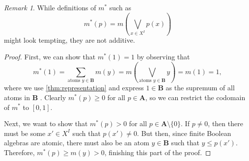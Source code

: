 \documentclass{article}
\theoremstyle{definition}
\theoremstyle{remark}
\newtheorem*{remark}{Remark}
\begin{document}
\begin{remark}
  While definitions of $m^*$ such as
  \[
    m^*(p) = m \left( \bigvee_{x \in X^I} p(x) \right)
  \]
  might look tempting, they are not additive.
\end{remark}

\begin{proof} %
  First, we can show that $m^*(1) = 1$ by observing that
  \[
    m^*(1) = \sum_{\text{atoms } y \in \mathbf{B}} m(y) = m \left(
      \bigvee_{\text{atoms } y \in \mathbf{B}} y \right) = m(1) = 1,
  \]
  where we use \cref{thm:representation} and express $1 \in \mathbf{B}$ as the
  supremum of all atoms in $\mathbf{B}$ \cite{ganesh2006introduction}. Clearly
  $m^*(p) \ge 0$ for all $p \in \mathbf{A}$, so we can restrict the codomain of
  $m^*$ to $[0, 1]$.

  Next, we want to show that $m^*(p) > 0$ for all $p \in \mathbf{A} \setminus \{
  0 \}$. If $p \ne 0$, then there must be some $x' \in X^I$ such that $p(x') \ne
  0$. But then, since finite Boolean algebras are atomic, there must also be an
  atom $y \in \mathbf{B}$ such that $y \le p(x')$. Therefore, $m^*(p) \ge m(y) >
  0$, finishing this part of the proof.


\end{proof}
\end{document}
